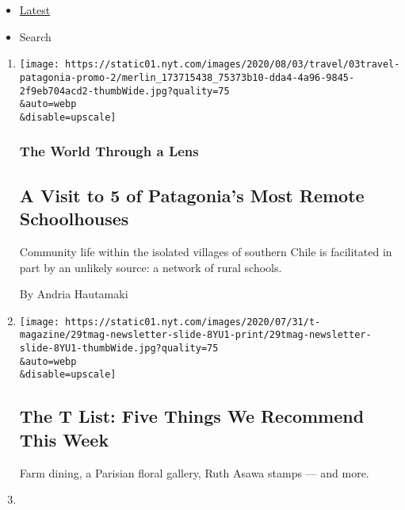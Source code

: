 \begin{itemize}
\tightlist
\item
  \protect\hyperlink{stream-panel}{Latest}
\item
  Search
\end{itemize}

\begin{enumerate}
\def\labelenumi{\arabic{enumi}.}
\item
  \href{/2020/08/03/travel/remote-schools-patagonia.html}{}

  \texttt{[image: https://static01.nyt.com/images/2020/08/03/travel/03travel-patagonia-promo-2/merlin\_173715438\_75373b10-dda4-4a96-9845-2f9eb704acd2-thumbWide.jpg?quality=75\\\&auto=webp\\\&disable=upscale]}

  \hypertarget{the-world-through-a-lens}{%
  \subsubsection{The World Through a
  Lens}\label{the-world-through-a-lens}}

  \hypertarget{a-visit-to-5-of-patagonias-most-remote-schoolhouses}{%
  \subsection{A Visit to 5 of Patagonia's Most Remote
  Schoolhouses}\label{a-visit-to-5-of-patagonias-most-remote-schoolhouses}}

  Community life within the isolated villages of southern Chile is
  facilitated in part by an unlikely source: a network of rural schools.

  By Andria Hautamaki
\item
  \href{/2020/07/30/t-magazine/the-t-list-five-things-we-recommend-this-week.html}{}

  \texttt{[image: https://static01.nyt.com/images/2020/07/31/t-magazine/29tmag-newsletter-slide-8YU1-print/29tmag-newsletter-slide-8YU1-thumbWide.jpg?quality=75\\\&auto=webp\\\&disable=upscale]}

  \hypertarget{the-t-list-five-things-we-recommend-this-week}{%
  \subsection{The T List: Five Things We Recommend This
  Week}\label{the-t-list-five-things-we-recommend-this-week}}

  Farm dining, a Parisian floral gallery, Ruth Asawa stamps --- and
  more.
\item
  \href{/2020/07/30/travel/private-jets-coronavirus.html}{}


\end{enumerate}
